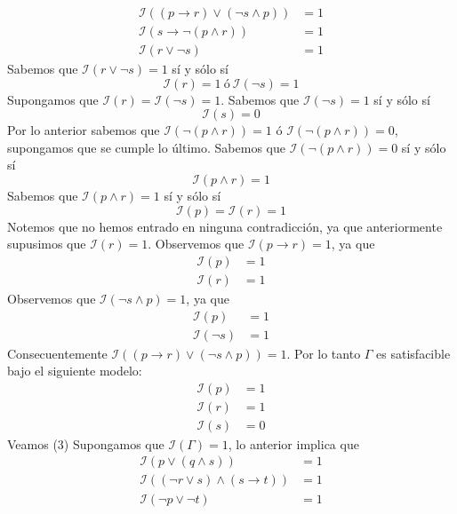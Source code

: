 \documentclass[a4paper]{article}
\begin{document}
\begin{align*}
    \mathcal{I}\left((p \to r) \lor (\lnot s \land p)\right) &= 1 \\ 
    \mathcal{I}\left(s \to \lnot(p \land r)\right) &= 1 \\
    \mathcal{I}\left(r \lor \lnot s\right) &= 1
\end{align*}
Sabemos que \(\mathcal{I}\left(r \lor \lnot s\right) = 1\) sí y sólo sí
\[
    \mathcal{I} \left(r \right) = 1 \ \text{ó} \ \mathcal{I} \left( \neg s \right) = 1
\]
Supongamos que \(\mathcal{I} \left(r \right) = \mathcal{I} \left( \neg s \right) = 1\).
Sabemos que \(\mathcal{I} \left( \neg s \right) = 1\) sí y sólo sí
\[
    \mathcal{I} \left( s \right) = 0
\]
Por lo anterior sabemos que \(\mathcal{I}\left(\lnot(p \land r)\right) = 1\) ó
\(\mathcal{I}\left(\lnot(p \land r)\right) = 0\), supongamos que se cumple lo último.
Sabemos que \(\mathcal{I}\left(\lnot(p \land r)\right) = 0\) sí y sólo sí
\[
    \mathcal{I}\left(p \land r\right) = 1
\]
Sabemos que \(\mathcal{I}\left(p \land r\right) = 1\) sí y sólo sí 
\[
    \mathcal{I}\left(p\right) = \mathcal{I}\left(r\right) = 1
\]
Notemos que no hemos entrado en ninguna contradicción, ya que anteriormente supusimos que
\(\mathcal{I}\left(r\right) = 1\). Observemos que \(\mathcal{I}\left(p \to r\right) = 1\), 
ya que
\begin{align*}
    \mathcal{I}\left(p\right) &= 1 \\
    \mathcal{I}\left(r\right) &= 1
\end{align*}
Observemos que \(\mathcal{I}\left(\lnot s \land p\right) = 1\), 
ya que
\begin{align*}
    \mathcal{I}\left(p\right) &= 1 \\
    \mathcal{I}\left(\lnot s\right) &= 1
\end{align*}
Consecuentemente \(\mathcal{I}\left((p \to r) \lor (\lnot s \land p)\right) = 1\).
Por lo tanto \(\Gamma\) es satisfacible bajo el siguiente modelo:
\begin{align*}
    \mathcal{I}\left(p\right) &= 1 \\
    \mathcal{I}\left(r\right) &= 1 \\
    \mathcal{I}\left(s\right) &= 0
\end{align*}
Veamos (3)
\newline
Supongamos que \(\mathcal{I}\left(\Gamma\right) = 1\), lo anterior implica que
\begin{align*}
    \mathcal{I}\left(p \lor (q\land s) \right) &= 1 \\
    \mathcal{I}\left((\lnot r \lor s) \land (s\to t)\right) &= 1 \\
    \mathcal{I}\left(\lnot p \lor \lnot t\right) &= 1
\end{align*}
\end{document}
